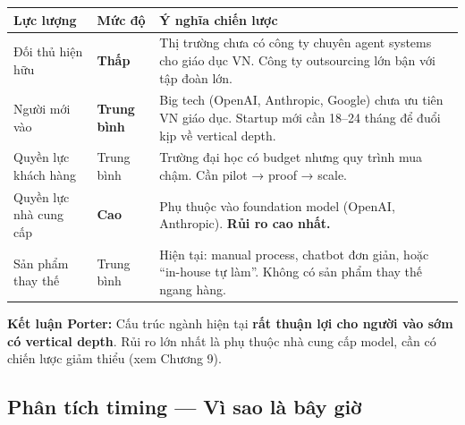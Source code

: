 \documentclass[11pt,a4paper]{article}
\begin{document}
\begin{tabularx}{\linewidth}{@{}p{4cm} p{1.8cm} X@{}}
\toprule
\textbf{Lực lượng} & \textbf{Mức độ} & \textbf{Ý nghĩa chiến lược} \\
\midrule
Đối thủ hiện hữu & \textbf{Thấp} & Thị trường chưa có công ty chuyên agent systems cho giáo dục VN. Công ty outsourcing lớn bận với tập đoàn lớn. \\
Người mới vào & \textbf{Trung bình} & Big tech (OpenAI, Anthropic, Google) chưa ưu tiên VN giáo dục. Startup mới cần 18--24 tháng để đuổi kịp về vertical depth. \\
Quyền lực khách hàng & Trung bình & Trường đại học có budget nhưng quy trình mua chậm. Cần pilot → proof → scale. \\
Quyền lực nhà cung cấp & \textbf{Cao} & Phụ thuộc vào foundation model (OpenAI, Anthropic). \textbf{Rủi ro cao nhất.} \\
Sản phẩm thay thế & Trung bình & Hiện tại: manual process, chatbot đơn giản, hoặc ``in-house tự làm''. Không có sản phẩm thay thế ngang hàng. \\
\bottomrule
\end{tabularx}

\textbf{Kết luận Porter:} Cấu trúc ngành hiện tại \textbf{rất thuận lợi cho người
vào sớm có vertical depth}. Rủi ro lớn nhất là phụ thuộc nhà cung cấp model, cần
có chiến lược giảm thiểu (xem Chương 9).

\subsection{Phân tích timing --- Vì sao là bây giờ}
\end{document}
